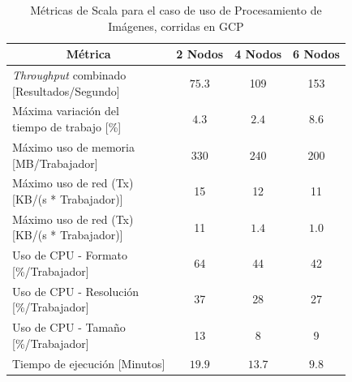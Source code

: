 \documentclass[11pt]{article}
\providecommand{\row}[1]{\parbox{150pt}{\setlength{\baselineskip}{0.2\baselineskip}\strut#1\strut}}
\newcommand{\ipcap}[2]{\caption{Métricas de #1 para el caso de uso de Procesamiento de Imágenes, corridas en #2}}
\newcommand{\english}[1]{\textit{#1}}
\begin{document}
\begin{table}[H]
\centering
\begin{tabular}{|l|c|c|c|}
\hline
\multicolumn{1}{|c|}{Métrica} & 2 Nodos & 4 Nodos & 6 Nodos \\ \hline
\row{\english{Throughput} combinado\\{[Resultados/Segundo]}} & $75.3$ & 109 & 153 \\ \hline
\row{Máxima variación del \\ tiempo de trabajo {[}\%{]}} & $4.3$ & $2.4$ & $8.6$ \\ \hline
\row{Máximo uso de memoria \\ {[MB/Trabajador]}} & 330 & 240 & 200 \\ \hline
\row{Máximo uso de red (Tx) \\ {[KB/(s * Trabajador)]}} & 15 & 12 & 11 \\ \hline
\row{Máximo uso de red (Tx) \\ {[KB/(s * Trabajador)]}} & 11 & $1.4$ & $1.0$ \\ \hline
\row{Uso de CPU - Formato\\{[\%/Trabajador]}} & 64 & 44 & 42 \\ \hline
\row{Uso de CPU - Resolución\\{[\%/Trabajador]}} & 37 & 28 & 27 \\ \hline
\row{Uso de CPU - Tamaño\\{[\%/Trabajador]}} & 13 & 8 & 9 \\ \hline
Tiempo de ejecución [Minutos] & $19.9$ & $13.7$ & $9.8$ \\ \hline
\end{tabular}
\ipcap{Scala}{GCP}
\end{table}
\end{document}
